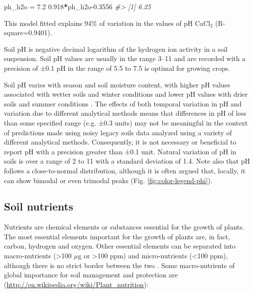 \documentclass[11pt]{krantz}
\makeatletter
\newenvironment{Shaded}{\begin{snugshade}}{\end{snugshade}}
\newcommand{\CommentTok}[1]{\textcolor[rgb]{0.37,0.37,0.37}{\textit{#1}}}
\newcommand{\FloatTok}[1]{\textcolor[rgb]{0.06,0.06,0.06}{#1}}
\newcommand{\NormalTok}[1]{#1}
\newcommand{\OperatorTok}[1]{\textcolor[rgb]{0.43,0.43,0.43}{\textbf{#1}}}
\newcommand{\StringTok}[1]{\textcolor[rgb]{0.5,0.5,0.5}{#1}}
\newenvironment{kframe}{%
\medskip{}
\setlength{\fboxsep}{.8em}
 \def\at@end@of@kframe{}%
 \ifinner\ifhmode%
  \def\at@end@of@kframe{\end{minipage}}%
  \begin{minipage}{\columnwidth}%
 \fi\fi%
 \def\FrameCommand##1{\hskip\@totalleftmargin \hskip-\fboxsep
 \colorbox{shadecolor}{##1}\hskip-\fboxsep
     \hskip-\linewidth \hskip-\@totalleftmargin \hskip\columnwidth}%
 \MakeFramed {\advance\hsize-\width
   \@totalleftmargin\z@ \linewidth\hsize
   \@setminipage}}%
 {\par\unskip\endMakeFramed%
 \at@end@of@kframe}
\newenvironment{rmdblock}[1]
  {
  \begin{itemize}
  \renewcommand{\labelitemi}{
    \raisebox{-.7\height}[0pt][0pt]{
      {\setkeys{Gin}{width=3em,keepaspectratio}\texttt{[image: images/\#1]}}
    }
  }
  \setlength{\fboxsep}{1em}
  \begin{kframe}
  \item
  }
  {
  \end{kframe}
  \end{itemize}
  }
\newenvironment{rmdnote}
  {\begin{rmdblock}{note}}
  {\end{rmdblock}}
\theoremstyle{definition}
\theoremstyle{definition}
\theoremstyle{definition}
\theoremstyle{remark}
\makeatother
\begin{document}
\begin{Shaded}
\begin{Highlighting}[]
\NormalTok{ph_h2o =}\StringTok{ }\FloatTok{7.2}
\FloatTok{0.918}\OperatorTok{*}\NormalTok{ph_h2o}\FloatTok{-0.3556}
\CommentTok{#> [1] 6.25}
\end{Highlighting}
\end{Shaded}

This model fitted explains 94\% of variation in the values of pH
CaCl\(_2\) (R-square=0.9401).

\begin{rmdnote}
Soil pH is negative decimal logarithm of the hydrogen ion activity in a
soil suspension. Soil pH values are usually in the range 3--11 and are
recorded with a precision of ±0.1 pH in the range of 5.5 to 7.5 is
optimal for growing crops.
\end{rmdnote}

Soil pH varies with season and soil moisture content, with higher pH
values associated with wetter soils and winter conditions and lower pH
values with drier soils and summer conditions \citep{Miller2010SSSAJ}.
The effects of both temporal variation in pH and variation due to
different analytical methods means that differences in pH of less than
some specified range (e.g. ±0.3 units) may not be meaningful in the
context of predictions made using noisy legacy soils data analyzed using
a variety of different analytical methods. Consequently, it is not
necessary or beneficial to report pH with a precision greater than ±0.1
unit. Natural variation of pH in soils is over a range of 2 to 11 with a
standard deviation of 1.4. Note also that pH follows a close-to-normal
distribution, although it is often argued that, locally, it can show
bimodal or even trimodal peaks (Fig. \ref{fig:color-legend-phi}).

\hypertarget{soil-nutrients}{%
\subsection{Soil nutrients}\label{soil-nutrients}}

Nutrients are chemical elements or substances essential for the growth
of plants. The most essential elements important for the growth of
plants are, in fact, carbon, hydrogen and oxygen. Other essential
elements can be separated into macro-nutrients (\textgreater{}100
\(\mu\)g or \textgreater{}100 ppm) and micro-nutrients (\textless{}100
ppm), although there is no strict border between the two
\citep{harpstead2001soil, hengl2017soil}. Some macro-nutrients of global
importance for soil management and protection are
(\url{http://en.wikipedia.org/wiki/Plant_nutrition}):
\end{document}
